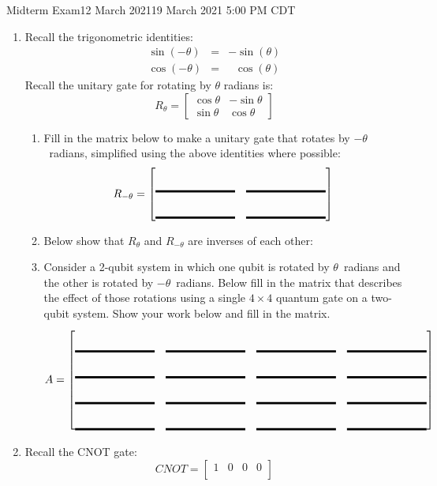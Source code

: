 \documentclass[12pt]{article}
\newcommand{\Blank}{\mbox{\vrule width 1in depth 2pt}\vrule width 0pt height 2.0em}
\begin{document}
\begin{assignment}{Midterm Exam}{12 March 2021}{19 March 2021 5:00 PM CDT}
\begin{enumerate}
\begin{enumerate}
  \item{} Can this be factored into the tensor product of two
qubits?\Blank{}
  \item{} Prove or disprove your claim below:
\LeaveSpace{2cm}
\end{enumerate}
\clearpage\item{}
Recall the trigonometric identities:
\begin{eqnarray*}
   \sin(-\theta) & = & -\sin(\theta) \\
   \cos(-\theta) & = & \ \ \,\cos(\theta)
\end{eqnarray*}
Recall the unitary gate for rotating by $\theta$ radians is:
\[
R_{\theta}=
\begin{bmatrix}
\cos{\theta} & -\sin{\theta} \\
\sin{\theta} & \cos{\theta}
\end{bmatrix}
\]
\begin{enumerate}
  \item{} Fill in the matrix below to make a unitary gate that
rotates by $-\theta$~radians, simplified using the above identities where
possible:
\[
R_{-\theta}=
\begin{bmatrix}
\Blank{} & \Blank{} \\
\Blank{} & \Blank{} 
\end{bmatrix}
\]
\item{} Below show that $R_\theta$ and $R_{-\theta}$ are inverses
of each other:
\LeaveSpace{2cm}
\item{} Consider a 2-qubit system in which one qubit is rotated by
$\theta$~radians and the other is rotated by $-\theta$~radians.
Below fill in the matrix that describes the effect of those rotations using
a single $4\times4$ quantum gate on a two-qubit system.  Show your work below and
fill in the matrix.
\LeaveSpace{4cm}
\[
A=
\begin{bmatrix}
\Blank{} & \Blank{} & \Blank{} & \Blank{}  \\
\Blank{} & \Blank{} & \Blank{} & \Blank{}  \\
\Blank{} & \Blank{} & \Blank{} & \Blank{}  \\
\Blank{} & \Blank{} & \Blank{} & \Blank{} 
\end{bmatrix}
\]
\end{enumerate}
\clearpage\item{}
Recall the CNOT gate:
\[
CNOT =
\begin{bmatrix}
1 & 0 & 0 & 0 \\

\end{bmatrix}\]
\end{enumerate}
\end{assignment}
\end{document}
